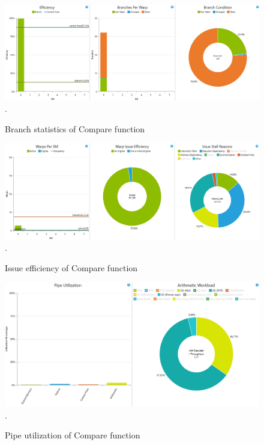 \documentclass[oneside,openright,12pt,final,en]{mgr}
\begin{document}
\begin{figure}[H]
	\centering
	\includegraphics[width=\textwidth]{compare_branch}.
	\caption{Branch statistics of Compare function}
	\label{fig:compare_branch}
\end{figure}

\begin{figure}[H]
	\centering
	\includegraphics[width=\textwidth]{compare_issue}.
	\caption{Issue efficiency of Compare function}
	\label{fig:compare_issue}
\end{figure}

\begin{figure}[H]
	\centering
	\includegraphics[width=\textwidth]{compare_pipe}.
	\caption{Pipe utilization of Compare function}
	\label{fig:compare_pipe}
\end{figure}
\end{document}
